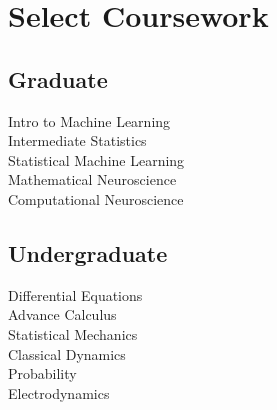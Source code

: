 \documentclass[]{deedy-resume-openfont}
\begin{document}
\begin{minipage}[t]{0.33\textwidth}


\section{Select Coursework}
\subsection{Graduate}
\vspace{1pt}
\regdescript
Intro to Machine Learning \\
Intermediate Statistics \\
Statistical Machine Learning\\
Mathematical Neuroscience\\
Computational Neuroscience\\
\sectionsep

\subsection{Undergraduate}
 \vspace{1pt}
 \regdescript
 Differential Equations\\
 Advance Calculus \\
 Statistical Mechanics\\
 Classical Dynamics\\
 Probability\\
 Electrodynamics\\
 


\end{minipage}
\end{document}

